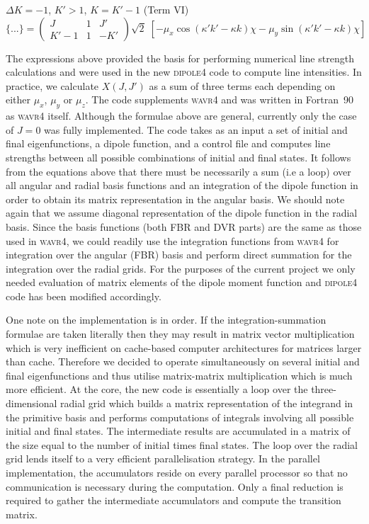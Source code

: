 $\Delta K = -1$, $K'> 1$, $K=K'-1$ (Term VI)
\begin{equation}
\{...\} = 
\left( \begin{array}{ccc} 
 J    &  1 &  J' \\
 K'-1 &  1 & -K'   \end{array} \right)
\sqrt{2} \; \left[ - \mu_x  \cos ( \kappa' k' - \kappa k) \chi 
- \mu_y  \sin ( \kappa' k' - \kappa k) \chi \right]
\end{equation}

The expressions above provided the basis for performing numerical line strength calculations
and were used in the new \textsc{dipole4} code to compute line intensities.
In practice, we calculate $X(J,J')$ as a sum of three terms each depending on either $\mu_x$, $\mu_y$ or $\mu_z$.
The code supplements \textsc{wavr4} \citep{Tennyson} 
and was written in Fortran~90 as \textsc{wavr4} itself.
Although the formulae above are general, currently only the case of $J=0$ 
was fully implemented.
The code takes as an input a set of initial and final eigenfunctions, a dipole function,
and a control file and computes line strengths between all possible combinations of 
initial and final states.
It follows from the equations above that there must be necessarily a sum (i.e a loop) over
all angular and radial basis functions and an integration of the dipole function
in order to obtain its matrix representation in the angular basis.
We should note again that we assume diagonal representation of the dipole function
in the radial basis.
Since the basis functions (both FBR and DVR parts) are the same as those
used in \textsc{wavr4}, we could readily use the integration functions from \textsc{wavr4} 
for integration over the angular (FBR) basis and perform
direct summation for the integration over the radial grids.
For the purposes of the current project we only needed evaluation of matrix elements of 
the dipole moment function and \textsc{dipole4} code has been modified accordingly.

One note on the implementation is in order.
If the integration-summation formulae are taken literally then
they may result in matrix vector multiplication which is very
inefficient on cache-based computer architectures for matrices larger than cache.
Therefore we decided to operate simultaneously on several initial and final eigenfunctions
and thus utilise matrix-matrix multiplication which is much more efficient.
At the core, the new code is essentially a loop over the three-dimensional radial grid 
which builds a matrix representation of the integrand in the primitive basis 
and performs computations of integrals involving all possible initial and final states.  
The intermediate results are accumulated in a matrix of the size equal to the number 
of initial times final states.
The loop over the radial grid lends itself to a very efficient parallelisation strategy.
In the parallel implementation, the accumulators reside on every
parallel processor so that no communication is necessary during the computation.
Only a final reduction is required to gather the intermediate accumulators 
and compute the transition matrix.


